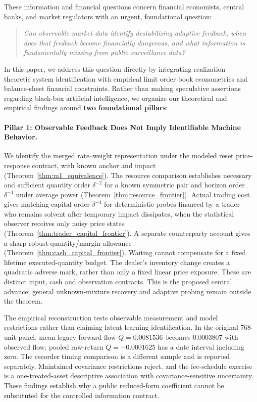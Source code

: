 \documentclass[12pt]{article}
\theoremstyle{definition}
\theoremstyle{remark}
\begin{document}
These information and financial questions concern financial economists, central banks, and market regulators with an urgent, foundational question:
\begin{quote}
\centering
\emph{Can observable market data identify destabilizing adaptive feedback, when does that feedback become financially dangerous, and what information is fundamentally missing from public surveillance data?}
\end{quote}

In this paper, we address this question directly by integrating realization-theoretic system identification with empirical limit order book econometrics and balance-sheet financial constraints. Rather than making speculative assertions regarding black-box artificial intelligence, we organize our theoretical and empirical findings around \textbf{two foundational pillars}:

\paragraph{Pillar 1: Observable Feedback Does Not Imply Identifiable Machine Behavior.}
We identify the merged rate--weight representation under the modeled reset price-response contract, with known anchor and impact (Theorem~\ref{thm:m1_equivalence}). The resource comparison establishes necessary and sufficient quantity order $\delta^{-2}$ for a known symmetric pair and horizon order $\delta^{-4}$ under average power (Theorem~\ref{thm:resource_frontier}). Actual trading cost gives matching capital order $\delta^{-4}$ for deterministic probes financed by a trader who remains solvent after temporary impact dissipates, when the statistical observer receives only noisy price states (Theorem~\ref{thm:trader_capital_frontier}). A separate counterparty account gives a sharp robust quantity/margin allowance (Theorem~\ref{thm:cash_capital_frontier}). Waiting cannot compensate for a fixed lifetime executed-quantity budget. The dealer's inventory change creates a quadratic adverse mark, rather than only a fixed linear price exposure. These are distinct input, cash and observation contracts. This is the proposed central advance; general unknown-mixture recovery and adaptive probing remain outside the theorem.

The empirical reconstruction tests observable measurement and model restrictions rather than claiming latent learning identification. In the original 768-unit panel, mean legacy forward-flow $Q=0.0081536$ becomes $0.0003807$ with observed flow; pooled raw-return $Q=-0.0001625$ has a date interval including zero. The recorder timing comparison is a different sample and is reported separately. Maintained covariance restrictions reject, and the fee-schedule exercise is a one-treated-asset descriptive association with covariance-sensitive uncertainty. These findings establish why a public reduced-form coefficient cannot be substituted for the controlled information contract.
\end{document}
